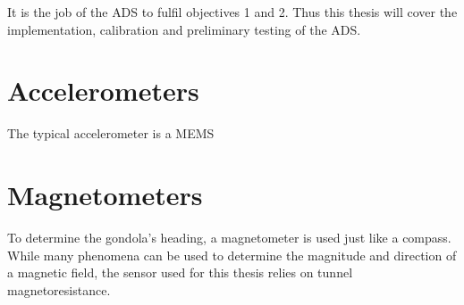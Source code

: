 It is the job of the \ac{ADS} to fulfil objectives 1 and 2. Thus this thesis will cover the implementation, calibration and preliminary testing of the \ac{ADS}.

\section{Accelerometers \label{sec:bg:accelerometers}}
The typical accelerometer is a \ac{MEMS}

\section{Magnetometers \label{sec:bg:magnetometers}}
To determine the gondola's heading, a magnetometer is used just like a compass. While many phenomena can be used to determine the magnitude and direction of a magnetic field, the sensor used for this thesis relies on tunnel magnetoresistance.